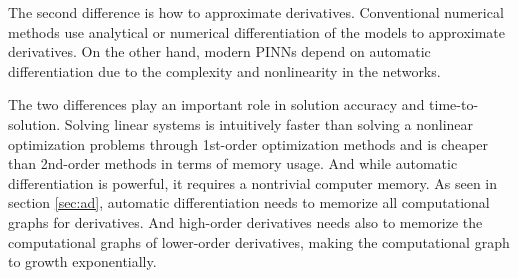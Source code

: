 The second difference is how to approximate derivatives.
Conventional numerical methods use analytical or numerical differentiation of the models to approximate derivatives.
On the other hand, modern PINNs depend on automatic differentiation due to the complexity and nonlinearity in the networks.

The two differences play an important role in solution accuracy and time-to-solution.
Solving linear systems is intuitively faster than solving a nonlinear optimization problems through 1st-order optimization methods and is cheaper than 2nd-order methods in terms of memory usage.
And while automatic differentiation is powerful, it requires a nontrivial computer memory.
As seen in section \ref{sec:ad}, automatic differentiation needs to memorize all computational graphs for derivatives.
And high-order derivatives needs also to memorize the computational graphs of lower-order derivatives, making the computational graph to growth exponentially.

